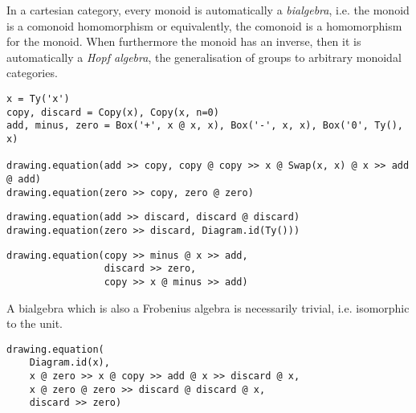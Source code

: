 \begin{example}
In a cartesian category, every monoid is automatically a \emph{bialgebra}, i.e. the monoid is a comonoid homomorphism or equivalently, the comonoid is a homomorphism for the monoid.
When furthermore the monoid has an inverse, then it is automatically a \emph{Hopf algebra}, the generalisation of groups to arbitrary monoidal categories.

\begin{verbatim}
x = Ty('x')
copy, discard = Copy(x), Copy(x, n=0)
add, minus, zero = Box('+', x @ x, x), Box('-', x, x), Box('0', Ty(), x)

drawing.equation(add >> copy, copy @ copy >> x @ Swap(x, x) @ x >> add @ add)
drawing.equation(zero >> copy, zero @ zero)
\end{verbatim}
\begin{center}
\hfill
{}
\end{center}
\begin{verbatim}
drawing.equation(add >> discard, discard @ discard)
drawing.equation(zero >> discard, Diagram.id(Ty()))
\end{verbatim}
\begin{center}
\hfill
{}
\end{center}
\begin{verbatim}
drawing.equation(copy >> minus @ x >> add,
                 discard >> zero,
                 copy >> x @ minus >> add)
\end{verbatim}

A bialgebra which is also a Frobenius algebra is necessarily trivial, i.e. isomorphic to the unit.

\begin{verbatim}
drawing.equation(
    Diagram.id(x),
    x @ zero >> x @ copy >> add @ x >> discard @ x,
    x @ zero @ zero >> discard @ discard @ x,
    discard >> zero)
\end{verbatim}

\end{example}

